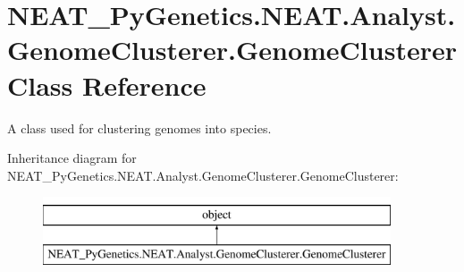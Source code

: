 \hypertarget{classNEAT__PyGenetics_1_1NEAT_1_1Analyst_1_1GenomeClusterer_1_1GenomeClusterer}{}\section{N\+E\+A\+T\+\_\+\+Py\+Genetics.\+N\+E\+A\+T.\+Analyst.\+Genome\+Clusterer.\+Genome\+Clusterer Class Reference}
\label{classNEAT__PyGenetics_1_1NEAT_1_1Analyst_1_1GenomeClusterer_1_1GenomeClusterer}


A class used for clustering genomes into species.  


Inheritance diagram for N\+E\+A\+T\+\_\+\+Py\+Genetics.\+N\+E\+A\+T.\+Analyst.\+Genome\+Clusterer.\+Genome\+Clusterer\+:\begin{figure}[H]
\begin{center}
\leavevmode
\includegraphics[height=2.000000cm]{classNEAT__PyGenetics_1_1NEAT_1_1Analyst_1_1GenomeClusterer_1_1GenomeClusterer}
\end{center}
\end{figure}
